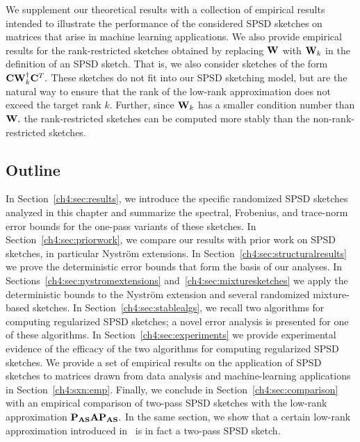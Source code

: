 We supplement our theoretical results with a collection of empirical results intended
to illustrate the performance of the considered SPSD sketches on matrices that
arise in machine learning applications. We also provide empirical results for the
rank-restricted sketches obtained by replacing $\mathbf{W}$ with $\mathbf{W}_k$ in the 
definition of an SPSD sketch. That is, we also consider sketches of the form
$\mathbf{C} \mathbf{W}_k^\dagger \mathbf{C}^T.$ These sketches do not fit into our SPSD
sketching model, but are the natural way to ensure that the rank of the low-rank
approximation does not exceed the target rank $k.$ Further, since $\mathbf{W}_k$ has
a smaller condition number than $\mathbf{W},$ the rank-restricted sketches can be
computed more stably than the non-rank-restricted sketches.

%

\subsection{Outline} In Section~\ref{ch4:sec:results}, we introduce the specific
randomized SPSD sketches analyzed in this chapter and summarize the
spectral, Frobenius, and trace-norm error bounds for the one-pass variants of these sketches.
In Section~\ref{ch4:sec:priorwork}, we compare our
results with prior work on SPSD sketches, in particular Nystr\"om extensions. 
In Section~\ref{ch4:sec:structuralresults} we
prove the deterministic error bounds that form the basis of our analyses. In 
Sections~\ref{ch4:sec:nystromextensions} and~\ref{ch4:sec:mixturesketches} 
we apply the deterministic bounds to the Nystr\"om extension and several randomized
mixture-based sketches. In Section~\ref{ch4:sec:stablealgs}, we recall two algorithms
for computing regularized SPSD sketches; a novel error analysis is presented for
one of these algorithms. In Section~\ref{ch4:sec:experiments} we provide
experimental evidence of the efficacy of the two algorithms for computing
regularized SPSD sketches. We provide a set of empirical results on the 
application of SPSD sketches to matrices drawn from
data analysis and machine-learning applications in Section~\ref{ch4:sxn:emp}. Finally,
we conclude in Section~\ref{ch4:sec:comparison} with an empirical comparison
of two-pass SPSD sketches with the low-rank approximation $\mathbf{P}_{\mathbf{A} \mathbf{S}} \mathbf{A} \mathbf{P}_{\mathbf{A} \mathbf{S}}.$
In the same section, we show that a certain low-rank approximation introduced in~\cite{HMT11}
is in fact a two-pass SPSD sketch.


